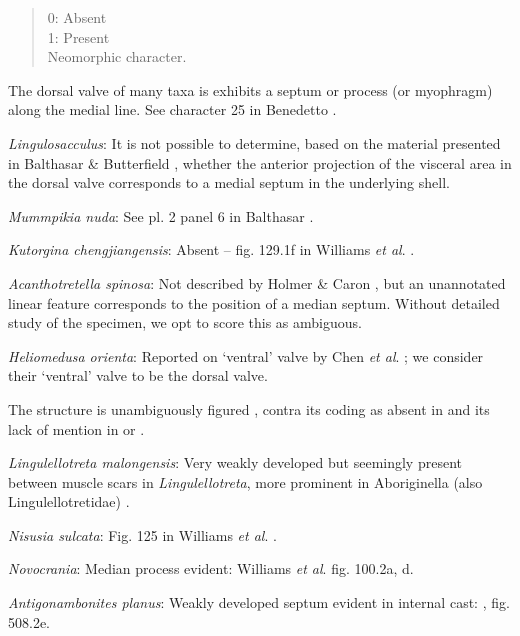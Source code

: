 \documentclass[openany]{book}
\theoremstyle{definition}
\theoremstyle{definition}
\theoremstyle{definition}
\theoremstyle{remark}
\begin{document}
\begin{quote}
0: Absent\\
1: Present\\
Neomorphic character.
\end{quote}

The dorsal valve of many taxa is exhibits a septum or process (or
myophragm) along the medial line. See character 25 in Benedetto
\citeyearpar{Benedetto2009iChaniella}.

\emph{Lingulosacculus}: It is not possible to determine, based on the
material presented in Balthasar \& Butterfield
\citeyearpar{Balthasar2009EarlyCambrian}, whether the anterior
projection of the visceral area in the dorsal valve corresponds to a
medial septum in the underlying shell.

\emph{Mummpikia nuda}: See pl. 2 panel 6 in Balthasar
\citeyearpar{Balthasar2008iMummpikia}.

\emph{Kutorgina chengjiangensis}: Absent -- fig. 129.1f in Williams
\emph{et al}. \citeyearpar{Williams2000BrachiopodaLinguliformea}.

\emph{Acanthotretella spinosa}: Not described by Holmer \& Caron
\citeyearpar{Holmer2006Aspinose}, but an unannotated linear feature
corresponds to the position of a median septum. Without detailed study
of the specimen, we opt to score this as ambiguous.

\emph{Heliomedusa orienta}: Reported on `ventral' valve by Chen \emph{et
al}. \citeyearpar{Chen2007Reinterpretationof}; we consider their
`ventral' valve to be the dorsal valve.

The structure is unambiguously figured \citep[e.g.~fig. 5.1
in][]{Chen2007Reinterpretationof}, contra its coding as absent in
\citet{Williams2000BrachiopodaLinguliformea} and its lack of mention in
\citet{Williams2007PartH} or \citet{Zhang2009Architectureand}.

\emph{Lingulellotreta malongensis}: Very weakly developed but seemingly
present between muscle scars in \emph{Lingulellotreta}, more prominent
in Aboriginella (also Lingulellotretidae) \citep[fig.
34]{Williams2000BrachiopodaLinguliformea}.

\emph{Nisusia sulcata}: Fig. 125 in Williams \emph{et al}.
\citeyearpar{Williams2000BrachiopodaLinguliformea}.

\emph{Novocrania}: Median process evident: Williams \emph{et al}.
\citeyearpar{Williams2000BrachiopodaLinguliformea} fig. 100.2a, d.

\emph{Antigonambonites planus}: Weakly developed septum evident in
internal cast: \citet{Williams2000BrachiopodaLinguliformea}, fig.
508.2e.
\end{document}
